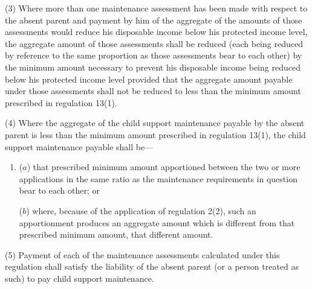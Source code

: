 \documentclass[12pt,a4paper]{article}
\begin{document}
(3) Where more than one maintenance assessment has been made with respect to the absent parent and payment by him of the aggregate of the amounts of those assessments would reduce his disposable income below his protected income level, the aggregate amount of those assessments shall be reduced (each being reduced by reference to the same proportion as those assessments bear to each other) by the minimum amount necessary to prevent his disposable income being reduced below his protected income level provided that the aggregate amount payable under those assessments shall not be reduced to less than the minimum amount prescribed in regulation 13(1).

(4) Where the aggregate of the child support maintenance payable by the absent parent is less than the minimum amount prescribed in regulation 13(1), the child support maintenance payable shall be---
\begin{enumerate}\item[]
($a$) that prescribed minimum amount apportioned between the two or more applications in the same ratio as the maintenance requirements in question bear to each other; or

($b$) where, because of the application of regulation 2(2), such an apportionment produces an aggregate amount which is different from that prescribed minimum amount, that different amount.
\end{enumerate}

(5) Payment of each of the maintenance assessments calculated under this regulation shall satisfy the liability of the absent parent (or a person treated as such) to pay child support maintenance.

\end{document}
